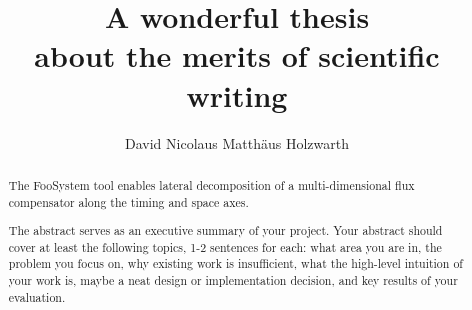 \documentclass[a4paper,11pt,oneside]{report}
\title{A wonderful thesis\\about the merits of scientific writing}
\author{David Nicolaus Matthäus Holzwarth}
\newcommand{\sysname}{FooSystem\xspace}
\begin{document}
\maketitle

\begin{abstract}
The \sysname tool enables lateral decomposition of a multi-dimensional
flux compensator along the timing and space axes.

The abstract serves as an executive summary of your project.
Your abstract should cover at least the following topics, 1-2 sentences for
each: what area you are in, the problem you focus on, why existing work is
insufficient, what the high-level intuition of your work is, maybe a neat
design or implementation decision, and key results of your evaluation.
\end{abstract}


\maketoc









\cleardoublepage
{}
{}
\printbibliography

%
%
\end{document}
